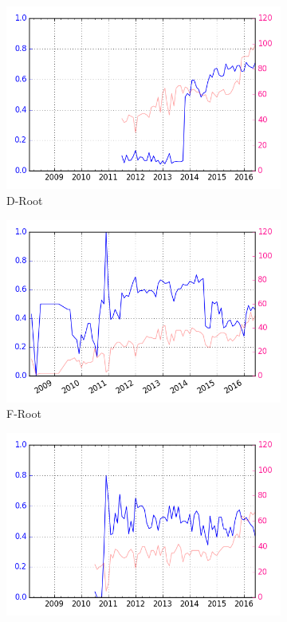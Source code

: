 \begin{appendices}
\begin{figure}[!htb]
\begin{subfigure}{.32\textwidth}
			\centering
			\includegraphics[width=\linewidth]{img/convergence_over_time_d.png}
			\caption{D-Root}
			\label{fig:convergence-d}
		\end{subfigure}		
		\begin{subfigure}{.32\textwidth}
			\centering
			\includegraphics[width=\linewidth]{img/convergence_over_time_f.png}
			\caption{F-Root}
			\label{fig:app:convergence-f}
		\end{subfigure}				
		\begin{subfigure}{.32\textwidth}
			\centering
			\includegraphics[width=\linewidth]{img/convergence_over_time_i.png}

\end{subfigure}
\end{figure}
\end{appendices}
